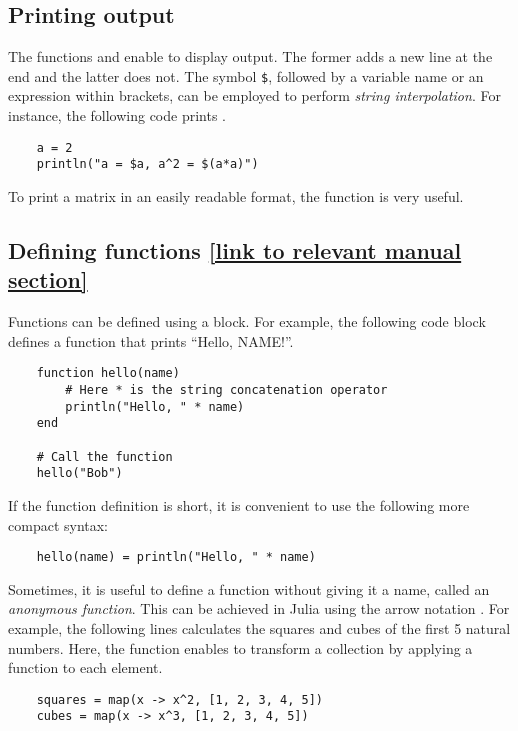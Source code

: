 \subsection*{Printing output}%
The functions  and  enable to display output.
The former adds a new line at the end and the latter does not.
The symbol \texttt{\$}, followed by a variable name or an expression within brackets,
can be employed to perform \emph{string interpolation}.
For instance, the following code prints .
\begin{verbatim}
    a = 2
    println("a = $a, a^2 = $(a*a)")
\end{verbatim}
To print a matrix in an easily readable format,
the  function is very useful.

\subsection*{Defining functions {\footnotesize \href{https://docs.julialang.org/en/v1/manual/functions/} {[link to relevant manual section]}}}%
\label{sub:defining_functions}
Functions can be defined using a  block.
For example, the following code block defines a function that prints ``Hello, NAME!''.

\begin{verbatim}
    function hello(name)
        # Here * is the string concatenation operator
        println("Hello, " * name)
    end

    # Call the function
    hello("Bob")
\end{verbatim}

If the function definition is short,
it is convenient to use the following more compact syntax:
\begin{verbatim}
    hello(name) = println("Hello, " * name)
\end{verbatim}

Sometimes, it is useful to define a function without giving it a name, called an \emph{anonymous function}.
This can be achieved in Julia using the arrow notation \julia{->}.
For example, the following lines calculates the squares and cubes of the first 5 natural numbers.
Here, the function  enables to transform a collection by applying a function to each element.
\begin{verbatim}
    squares = map(x -> x^2, [1, 2, 3, 4, 5])
    cubes = map(x -> x^3, [1, 2, 3, 4, 5])
\end{verbatim}

